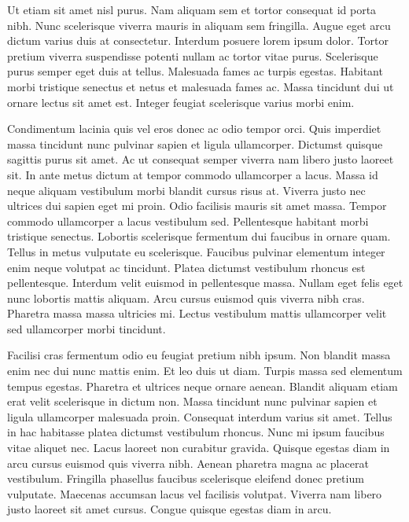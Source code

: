 \documentclass[11pt,a4paper]{article}
\begin{document}
Ut etiam sit amet nisl purus. Nam aliquam sem et tortor consequat id porta nibh. Nunc scelerisque viverra mauris in aliquam sem fringilla. Augue eget arcu dictum varius duis at consectetur. Interdum posuere lorem ipsum dolor. Tortor pretium viverra suspendisse potenti nullam ac tortor vitae purus. Scelerisque purus semper eget duis at tellus. Malesuada fames ac turpis egestas. Habitant morbi tristique senectus et netus et malesuada fames ac. Massa tincidunt dui ut ornare lectus sit amet est. Integer feugiat scelerisque varius morbi enim.

Condimentum lacinia quis vel eros donec ac odio tempor orci. Quis imperdiet massa tincidunt nunc pulvinar sapien et ligula ullamcorper. Dictumst quisque sagittis purus sit amet. Ac ut consequat semper viverra nam libero justo laoreet sit. In ante metus dictum at tempor commodo ullamcorper a lacus. Massa id neque aliquam vestibulum morbi blandit cursus risus at. Viverra justo nec ultrices dui sapien eget mi proin. Odio facilisis mauris sit amet massa. Tempor commodo ullamcorper a lacus vestibulum sed. Pellentesque habitant morbi tristique senectus. Lobortis scelerisque fermentum dui faucibus in ornare quam. Tellus in metus vulputate eu scelerisque. Faucibus pulvinar elementum integer enim neque volutpat ac tincidunt. Platea dictumst vestibulum rhoncus est pellentesque. Interdum velit euismod in pellentesque massa. Nullam eget felis eget nunc lobortis mattis aliquam. Arcu cursus euismod quis viverra nibh cras. Pharetra massa massa ultricies mi. Lectus vestibulum mattis ullamcorper velit sed ullamcorper morbi tincidunt.

Facilisi cras fermentum odio eu feugiat pretium nibh ipsum. Non blandit massa enim nec dui nunc mattis enim. Et leo duis ut diam. Turpis massa sed elementum tempus egestas. Pharetra et ultrices neque ornare aenean. Blandit aliquam etiam erat velit scelerisque in dictum non. Massa tincidunt nunc pulvinar sapien et ligula ullamcorper malesuada proin. Consequat interdum varius sit amet. Tellus in hac habitasse platea dictumst vestibulum rhoncus. Nunc mi ipsum faucibus vitae aliquet nec. Lacus laoreet non curabitur gravida. Quisque egestas diam in arcu cursus euismod quis viverra nibh. Aenean pharetra magna ac placerat vestibulum. Fringilla phasellus faucibus scelerisque eleifend donec pretium vulputate. Maecenas accumsan lacus vel facilisis volutpat. Viverra nam libero justo laoreet sit amet cursus. Congue quisque egestas diam in arcu.
\end{document}
